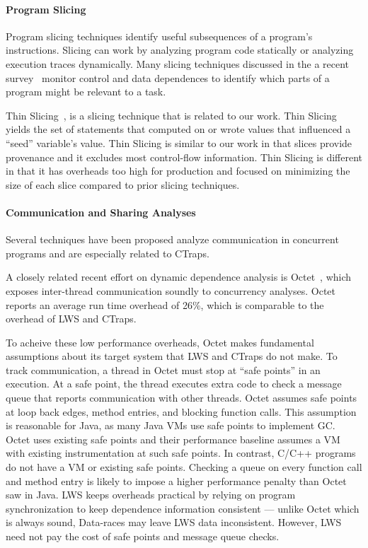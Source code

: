 \documentclass[10pt,nocopyrightspace]{sigplanconf}
\newcommand{\ctraps}{CTraps\xspace}
\newcommand{\lws}{LWS\xspace}
\begin{document}
\paragraph{Program Slicing}
Program slicing techniques identify useful subsequences of a program's
instructions.   Slicing can work by analyzing program code statically or
analyzing execution traces dynamically.  Many slicing techniques discussed in
the a recent survey~\cite{tipslicingsurvey} monitor control and data
dependences to identify which parts of a program might be relevant to a task.

Thin Slicing~\cite{thinslicing}, is a slicing technique that is related to our
work.  Thin Slicing yields the set of statements that computed on or wrote
values that influenced a ``seed'' variable's value.  Thin
Slicing is similar to our work in that slices provide provenance and it excludes most
control-flow information.  Thin Slicing is different in that it has
overheads too high for production and focused on minimizing the size of each
slice compared to prior slicing techniques. 


\paragraph{Communication and Sharing Analyses}
Several techniques have been proposed analyze communication in concurrent
programs and are especially related to \ctraps.  

A closely related recent effort on dynamic dependence analysis is
Octet~\cite{octet}, which exposes inter-thread communication soundly to
concurrency analyses.   Octet reports an average run time overhead of 26\%,
which is comparable to the overhead of \lws and \ctraps.  

To acheive these low performance overheads, Octet makes fundamental assumptions
about its target system that \lws and \ctraps do not make.  To track
communication, a thread in Octet must stop at ``safe points'' in an execution.
At a safe point, the thread executes extra code to check a message queue that
reports communication with other threads.  Octet assumes safe points at loop
back edges, method entries, and blocking function calls.  This assumption is
reasonable for Java, as many Java VMs use safe points to implement GC.  Octet
uses existing safe points and their performance baseline assumes a VM with
existing instrumentation at such safe points.  In contrast, C/C++ programs do
not have a VM or existing safe points.   Checking a queue on every function
call and method entry is likely to impose a higher performance penalty than
Octet saw in Java.  \lws keeps overheads practical by relying on program
synchronization to keep dependence information consistent --- unlike Octet
which is always sound, Data-races may leave \lws data inconsistent.  However,
\lws need not pay the cost of safe points and message queue checks.
\end{document}
